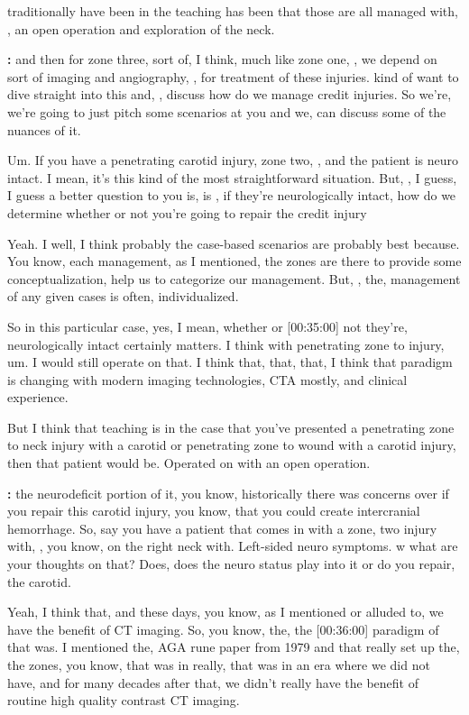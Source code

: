 \documentclass[
]{book}
\begin{document}
traditionally have been in the teaching has been that those are all
managed with, , an open operation and exploration of the neck.

\textbf{:} and then for
zone three, sort of, I think, much like zone one, , we depend on sort of
imaging and angiography, , for treatment of these injuries. kind of want
to dive straight into this and, , discuss how do we manage credit
injuries. So we're, we're going to just pitch some scenarios at you and
we, can discuss some of the nuances of it.

Um. If you have a penetrating carotid injury, zone two, , and the
patient is neuro intact. I mean, it's this kind of the most
straightforward situation. But, , I guess, I guess a better question to
you is, is , if they're neurologically intact, how do we determine
whether or not you're going to repair the credit injury

Yeah. I well,
I think probably the case-based scenarios are probably best because. You
know, each management, as I mentioned, the zones are there to
provide some conceptualization, help us to categorize our management.
But, , the, management of any given cases is often, individualized.

So in this particular case, yes, I mean, whether or {[}00:35:00{]} not
they're, neurologically intact certainly matters. I think with
penetrating zone to injury, um. I would still operate on that. I think
that, that, that, I think that paradigm is changing with modern
imaging technologies, CTA mostly, and clinical experience.

But I think that teaching is in the case that you've presented a
penetrating zone to neck injury with a carotid or penetrating zone to
wound with a carotid injury, then that patient would be. Operated on
with an open operation.

\textbf{:} the neurodeficit
portion of it, you know, historically there was concerns over if you
repair this carotid injury, you know, that you could create
intercranial hemorrhage. So, say you have a patient that comes in with a
zone, two injury with, , you know, on the right neck with. Left-sided
neuro symptoms. w what are your thoughts on that? Does, does the
neuro status play into it or do you repair, the carotid.

Yeah, I think
that, and these days, you know, as I mentioned or alluded to, we have
the benefit of CT imaging. So, you know, the, the {[}00:36:00{]} paradigm of
that was. I mentioned the, AGA rune paper from 1979 and that really set
up the, the zones, you know, that was in really, that was in an era
where we did not have, and for many decades after that, we didn't really
have the benefit of routine high quality contrast CT imaging.
\end{document}
